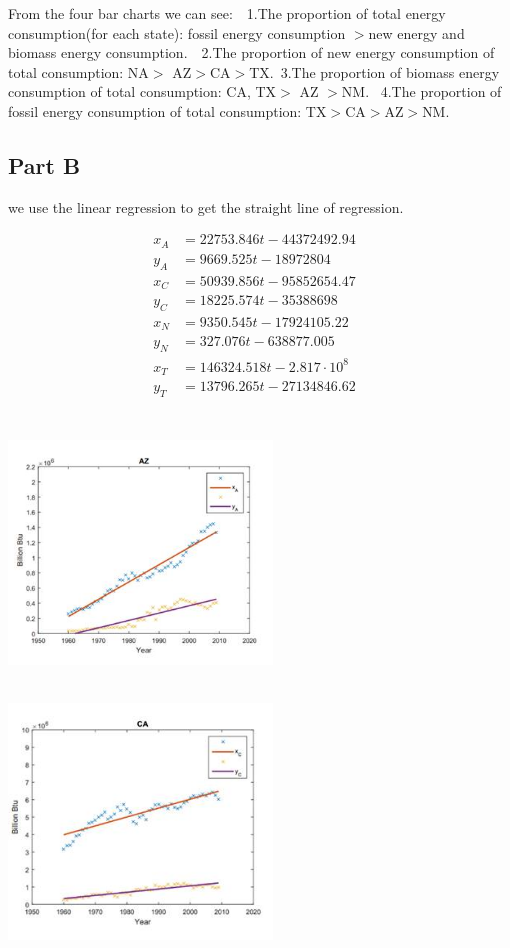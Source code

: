 \documentclass[12pt]{article}
\begin{document}
From the four bar charts we can see:\ \ 1.The proportion of total energy consumption(for each state): fossil energy consumption $>$new energy and biomass energy consumption.\ \ 2.The proportion of new energy consumption of total consumption: NA$>$ AZ$>$CA$>$TX.\ 3.The proportion of biomass energy consumption of total consumption: CA, TX$>$ AZ $>$NM.  \ 4.The proportion of fossil energy consumption of total consumption: TX$>$CA$>$AZ$>$NM.


\subsection{Part \uppercase\expandafter{}  B}

we use the linear regression to get the straight line of regression.

\begin{align*}
x_{A}&= 22753.846t-44372492.94& \\
y_{A} &= 9669.525t-18972804&\\
x_{C}&= 50939.856t-95852654.47& \\
y_{C} &= 18225.574t-35388698&\\
x_{N}&= 9350.545t-17924105.22&\\
y_{N} &= 327.076t-638877.005&\\
x_{T}&= 146324.518t-2.817\cdot 10^{8}& \\
y_{T} &= 13796.265t-27134846.62&\\
\end{align*}

\includegraphics[width=7cm,height=7cm]{b1.jpg}
\includegraphics[width=7cm,height=7cm]{b2.jpg}
\end{document}
